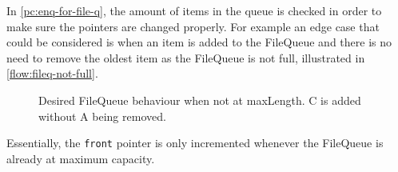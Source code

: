         In \autoref{pc:enq-for-file-q}, the amount of items in the queue is checked in order to make sure the pointers are changed properly. 
        For example an edge case that could be considered is when an item is added to the FileQueue and there is no need to remove the oldest item as the FileQueue is not full, illustrated in \autoref{flow:fileq-not-full}.

        \begin{figure}[!ht]
            \centering
            \caption{Desired FileQueue behaviour when not at maxLength. C is added without A being removed.}
            \label{flow:fileq-not-full}
        \end{figure}

        Essentially, the \verb|front| pointer is only incremented whenever the FileQueue is already at maximum capacity.

